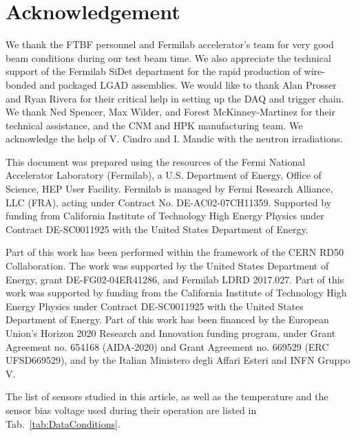 \documentclass[preprint,1p]{elsarticle}
\begin{document}
\section*{Acknowledgement}

We thank the FTBF personnel and Fermilab accelerator's team for very good beam
conditions during our test beam time. We also appreciate the technical support
of the Fermilab SiDet department for the rapid production of wire-bonded and
packaged LGAD assemblies. We would like to thank Alan Prosser and Ryan Rivera
for their critical help in setting up the DAQ and trigger chain. We thank Ned
Spencer, Max Wilder, and Forest McKinney-Martinez for their technical
assistance, and the CNM and HPK manufacturing team. We acknowledge the help of
V. Cindro and I. Mandic with the neutron irradiations. 

This document was prepared using the resources of the Fermi National Accelerator
Laboratory (Fermilab), a U.S. Department of Energy, Office of Science, HEP User
Facility. Fermilab is managed by Fermi Research Alliance, LLC (FRA), acting
under Contract No. DE-AC02-07CH11359. Supported by funding from California Institute of
Technology High Energy Physics under Contract DE-SC0011925 with the United
States Department of Energy.

Part of this work has been performed within the framework of the CERN RD50
Collaboration. The work was supported by the United States Department of Energy,
grant DE-FG02-04ER41286, and Fermilab LDRD 2017.027. Part of this work was supported
by funding from the California Institute of Technology High Energy Physics under 
Contract DE-SC0011925 with the United States Department of Energy.
Part of this work has been
financed by the European Union’s Horizon 2020 Research and Innovation funding
program, under Grant Agreement no. 654168 (AIDA-2020) and Grant Agreement no.
669529 (ERC UFSD669529), and by the Italian Ministero degli Affari Esteri and
INFN Gruppo V.




%

The list of sensors studied in this article, as well as the temperature and the
sensor bias voltage used during their operation are listed in
Tab.~\ref{tab:DataConditions}. 
\end{document}
